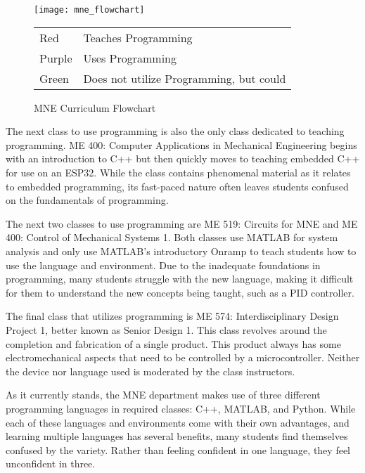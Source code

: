 \begin{figure}[h]
    \texttt{[image: mne\_flowchart]}
    \begin{tabular}{l@{ : }l}
        Red & Teaches Programming \\
        Purple & Uses Programming \\
        Green & Does not utilize Programming, but could \\
    \end{tabular}
    \centering
    \caption{MNE Curriculum Flowchart}
    \centering
    \label{fig:mne_flowchart}
\end{figure}

The next class to use programming is also the only class dedicated to teaching programming.
ME 400: Computer Applications in Mechanical Engineering begins with an introduction to C++
but then quickly moves to teaching embedded C++ for use on an ESP32. While the class
contains phenomenal material as it relates to embedded programming, its fast-paced nature
often leaves students confused on the fundamentals of programming. 

The next two classes to use programming are ME 519: Circuits for MNE and ME 400:
Control of Mechanical Systems 1. Both classes use MATLAB for system analysis and only use
MATLAB's introductory Onramp to teach students how to use the language and environment.
Due to the inadequate foundations in programming, many students struggle with the new language,
making it difficult for them to understand the new concepts being taught, such as a PID
controller.


The final class that utilizes programming is ME 574: Interdisciplinary Design Project 1, 
better known as Senior Design 1. This class revolves around the completion and fabrication
of a single product. This product always has some electromechanical aspects that need to
be controlled by a microcontroller. Neither the device nor language used is moderated by
the class instructors.

As it currently stands, the MNE department makes use of three different programming languages
in required classes: C++, MATLAB, and Python. While each of these languages and 
environments come with their own advantages, and learning multiple languages has several benefits,
many students find themselves confused by the variety. Rather than
feeling confident in one language, they feel unconfident in three.

